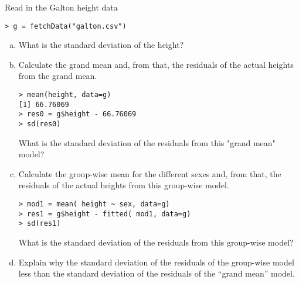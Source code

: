 
Read in the Galton height data
\begin{verbatim}
> g = fetchData("galton.csv")
\end{verbatim}

\begin{enumerate}[(a)]
\item What is the standard deviation of the height?
\item Calculate the grand mean and, from that, the residuals of the
  actual heights from the grand mean.
\begin{verbatim}
> mean(height, data=g)
[1] 66.76069
> res0 = g$height - 66.76069
> sd(res0)
\end{verbatim}
What is the standard deviation of the residuals from this "grand mean"
model? 
\item Calculate the group-wise mean for the different sexes and, from
  that, the residuals of the actual heights from this group-wise
  model.
\begin{verbatim}
> mod1 = mean( height ~ sex, data=g)
> res1 = g$height - fitted( mod1, data=g)
> sd(res1)
\end{verbatim}
What is the standard deviation of the residuals from this group-wise
model? 
\item Explain why the standard deviation of the residuals of the
  group-wise model less than the standard deviation of the residuals
  of the ``grand mean'' model. \TextEntry

\end{enumerate}